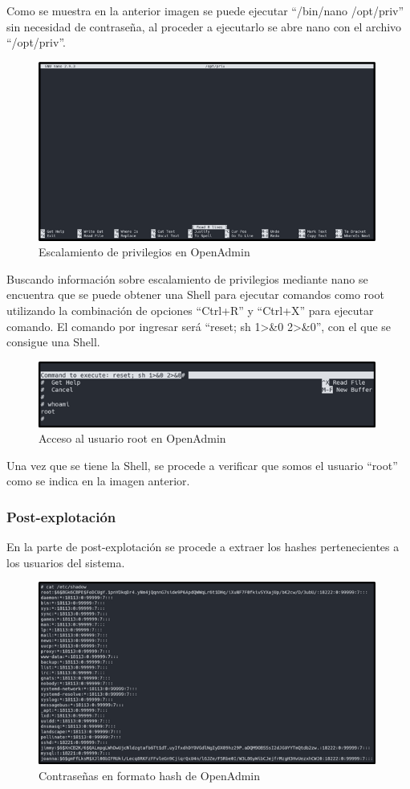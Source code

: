 Como se muestra en la anterior imagen se puede ejecutar “/bin/nano /opt/priv” sin necesidad de contraseña, al proceder a ejecutarlo se abre nano con el archivo “/opt/priv”.
\begin{figure}[H]
    \centering
    \includegraphics[width=0.99\textwidth]{imagenes/espop.png}
    \caption{Escalamiento de privilegios en OpenAdmin}
\end{figure}
Buscando información sobre escalamiento de privilegios mediante nano se encuentra que se puede obtener una Shell para ejecutar comandos como root utilizando la combinación de opciones “Ctrl+R” y “Ctrl+X” para ejecutar comando. El comando por ingresar será “reset; sh 1\textgreater\&0 2\textgreater\&0”, con el que se consigue una Shell.
\begin{figure}[H]
    \centering
    \includegraphics[width=0.99\textwidth]{imagenes/acroot.png}
    \caption{Acceso al usuario root en OpenAdmin}
\end{figure}
Una vez que se tiene la Shell, se procede a verificar que somos el usuario “root” como se indica en la imagen anterior.
\clearpage
\subsubsection{Post-explotación}
En la parte de post-explotación se procede a extraer los hashes pertenecientes a los usuarios del sistema.
\begin{figure}[H]
    \centering
    \includegraphics[width=0.99\textwidth]{imagenes/hashop.png}
    \caption{Contraseñas en formato hash de OpenAdmin}
\end{figure}
